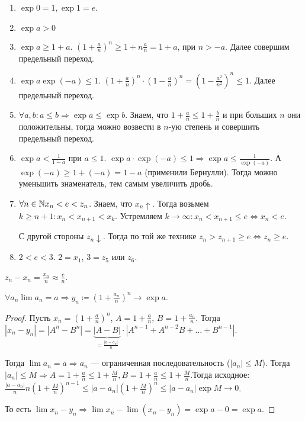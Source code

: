 \begin{enumerate}
    \item $\exp 0 = 1, \exp 1 = e$.
    \item  $\exp a > 0$
    \item  $\exp a \ge 1+a$. $\left(1+\frac{a}{n}\right)^n \ge 1 + n \frac{a}{n} = 1+a$, при $n > -a$. Далее совершим предельный переход.
    \item  $\exp a \exp (-a) \le 1$. $\left(1+\frac{a}{n}\right)^n\cdot\left(1-\frac{a}{n}\right)^n = \left(1-\frac{a^2}{n^2}\right)^n \le 1$. Далее предельный переход.
    \item $\forall a, b: a \le b \Rightarrow \exp a \le \exp b$. Знаем, что $1 + \frac{a}{n} \le 1 + \frac{b}{n}$ и при больших $n$ они положительны, тогда можно возвести в  $n$-ую степень и совершить предельный переход. 
    \item  $\exp a < \frac{1}{1-a}$ при $a \le 1$. $\exp a \cdot \exp (-a) \le 1 \Rightarrow \exp a \le \frac{1}{\exp(-a)}$. А $\exp(-a) \ge 1 + (-a) = 1 - a$ (применили Бернулли). Тогда можно уменьшить знаменатель, тем самым увеличить дробь.
    \item $\forall n \in \mathbb{N} x_n < e < z_n$. Знаем, что $x_n \uparrow$. Тогда возьмем  $k \ge n + 1: x_n < x_{n+1} < x_k$. Устремляем $k \to \infty: x_n < x_{n+1} \le e \iff x_n < e$.

        С другой стороны $z_n \downarrow$. Тогда по той же технике $z_n > z_{n+1} \ge e \iff z_n \ge e$.
    \item $2 < e < 3$. $2 = x_1$,  $3 = z_{5}$ или  $z_6$.
\end{enumerate}
\begin{remark}
    $z_n - x_n = \frac{x_n}{n} \approx \frac{e}{n}$.
\end{remark}
\begin{lemma}
    $\forall a_n \lim a_n = a \Rightarrow y_n \coloneqq (1+\frac{a_n}{n})^n \to \exp a$.
\end{lemma}
\begin{proof}
    Пусть $x_n = (1+\frac{a}{n})^n$, $A = 1 + \frac{a}{n}$, $B = 1 + \frac{a_n}{n}$. Тогда $|x_n - y_n| = |A^n - B^n| = \underbrace{|A-B|}_{=\frac{|a-a_n|}{n}}\cdot|A^{n-1} + A^{n-2}B + \ldots + B^{n-1}|$.

    Тогда $\lim a_n = a \Rightarrow a_n$ --- ограниченная последовательность ($|a_n| \le M$). Тогда  $|a_n| \le M \Rightarrow A = 1 + \frac{a}{n} \le 1 + \frac{M}{n}, B = 1 + \frac{a}{n} \le 1 + \frac{M}{n}$.Тогда исходное: $\frac{|a-a_n|}{n} n \left(1+\frac{M}{n}\right)^{n-1} \le |a-a_n|(1+\frac{M}{n})^n \le |a-a_n|\exp M \to 0$.

    То есть $\lim x_n - y_n \Rightarrow \lim x_n - \lim (x_n - y_n) = \exp a - 0 = \exp a$.
\end{proof}

